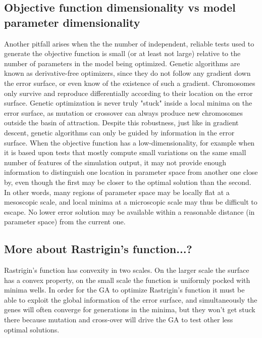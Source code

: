 \subsection{Objective function dimensionality vs model parameter dimensionality}    
Another pitfall arises when the the number of independent, reliable tests used to generate the objective function is small (or at least not large) relative to the number of parameters in the model being optimized.
Genetic algorithms are known as derivative-free optimizers, since they do not follow any gradient down the error surface, or even know of the existence of such a gradient.
Chromosomes only survive and reproduce differentially according to their location on the error surface.
Genetic optimization is never truly "stuck" inside a local minima on the error surface, as mutation or crossover can always produce new chromosomes outside the basin of attraction. Despite this robustness, just like in gradient descent, genetic algorithms can only be guided by information in the error surface.
When the objective function has a low-dimensionality, for example when it is based upon tests that mostly compute small variations on the same small number of features of the simulation output, it may not provide enough information to distinguish one location in parameter space from another one close by, even though the first may be closer to the optimal solution than the second.
In other words, many regions of parameter space may be locally flat at a mesoscopic scale, and local minima at a microscopic scale may thus be difficult to escape.
No lower error solution may be available within a reasonable distance (in parameter space) from the current one.

\subsection{More about Rastrigin's function...?}
Rastrigin's function has convexity in two scales. On the larger scale the surface has a convex property, on the small scale the function is uniformly pocked with minima wells. In order for the GA to optimize Rastrigin's function it must be able to exploit the global information of the error surface, and simultaneously the genes will often converge for generations in the minima, but they won't get stuck there because mutation and cross-over will drive the GA to test other less optimal solutions.\\
   
